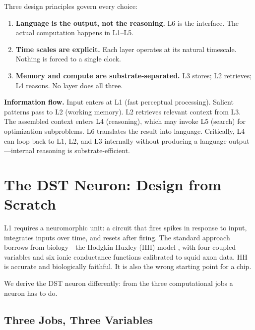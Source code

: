 \documentclass[12pt]{article}
\begin{document}
\noindent Three design principles govern every choice:

\begin{enumerate}
    \item \textbf{Language is the output, not the reasoning.} L6 is the interface. The actual computation happens in L1--L5.
    \item \textbf{Time scales are explicit.} Each layer operates at its natural timescale. Nothing is forced to a single clock.
    \item \textbf{Memory and compute are substrate-separated.} L3 stores; L2 retrieves; L4 reasons. No layer does all three.
\end{enumerate}

\noindent\textbf{Information flow.} Input enters at L1 (fast perceptual processing). Salient patterns pass to L2 (working memory). L2 retrieves relevant context from L3. The assembled context enters L4 (reasoning), which may invoke L5 (search) for optimization subproblems. L6 translates the result into language. Critically, L4 can loop back to L1, L2, and L3 internally without producing a language output---internal reasoning is substrate-efficient.

\section{The DST Neuron: Design from Scratch}
\label{sec:dst}

L1 requires a neuromorphic unit: a circuit that fires spikes in response to input, integrates inputs over time, and resets after firing. The standard approach borrows from biology---the Hodgkin-Huxley (HH) model \cite{hodgkin1952}, with four coupled variables and six ionic conductance functions calibrated to squid axon data. HH is accurate and biologically faithful. It is also the wrong starting point for a chip.

We derive the DST neuron differently: from the three computational jobs a neuron has to do.

\subsection{Three Jobs, Three Variables}
\end{document}
